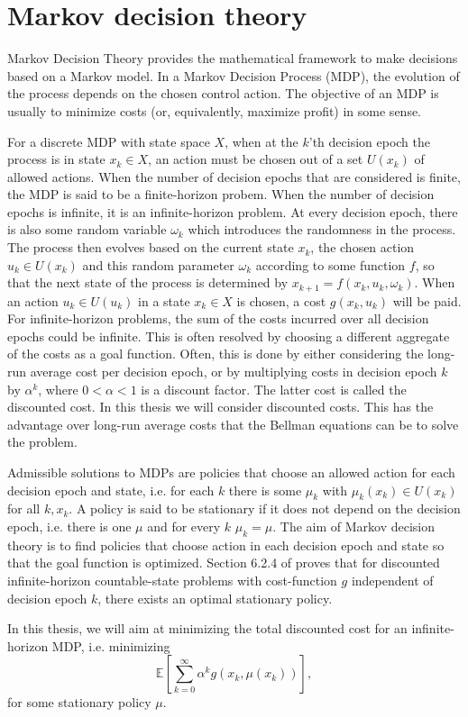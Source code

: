 \section{Markov decision theory}
Markov Decision Theory provides the mathematical framework to make decisions based on a Markov model.
In a Markov Decision Process (MDP), the evolution of the process depends on the chosen control action.
The objective of an MDP is usually to minimize costs (or, equivalently, maximize profit) in some sense.

For a discrete MDP with state space $X$, when at the $k$'th decision epoch the process is in state $x_k\in X$, an action must be chosen out of a set $U(x_k)$ of allowed actions.
When the number of decision epochs that are considered is finite, the MDP is said to be a finite-horizon probem.
When the number of decision epochs is infinite, it is an infinite-horizon problem.
At every decision epoch, there is also some random variable $\omega_k$ which introduces the randomness in the process.
The process then evolves based on the current state $x_k$, the chosen action $u_k\in U(x_k)$ and this random parameter $\omega_k$ according to some function $f$, so that the next state of the process is determined by $x_{k+1}=f(x_k,u_k,\omega_k)$.
When an action $u_k\in U(u_k)$ in a state $x_k\in X$ is chosen, a cost $g(x_k,u_k)$ will be paid.
For infinite-horizon problems, the sum of the costs incurred over all decision epochs could be infinite.
This is often resolved by choosing a different aggregate of the costs as a goal function.
Often, this is done by either considering the long-run average cost per decision epoch, or by multiplying costs in decision epoch $k$ by $\alpha^k$, where $0<\alpha<1$ is a discount factor.
The latter cost is called the discounted cost.
In this thesis we will consider discounted costs.
This has the advantage over long-run average costs that the Bellman equations can be to solve the problem.

Admissible solutions to MDPs are policies that choose an allowed action for each decision epoch and state, i.e. for each $k$ there is some $\mu_k$ with $\mu_k(x_k)\in U(x_k)$ for all $k,x_k$.
A policy is said to be stationary if it does not depend on the decision epoch, i.e. there is one $\mu$ and for every $k$ $\mu_k=\mu$.
The aim of Markov decision theory is to find policies that choose action in each decision epoch and state so that the goal function is optimized.
Section 6.2.4 of \cite{Puterman2008} proves that for discounted infinite-horizon countable-state problems with cost-function $g$ independent of decision epoch $k$, there exists an optimal stationary policy.

In this thesis, we will aim at minimizing the total discounted cost for an infinite-horizon MDP, i.e. minimizing
\[
\mathbb{E}\left[\sum\limits_{k=0}^\infty \alpha^k g(x_k,\mu(x_k))\right],
\]
for some stationary policy $\mu$.